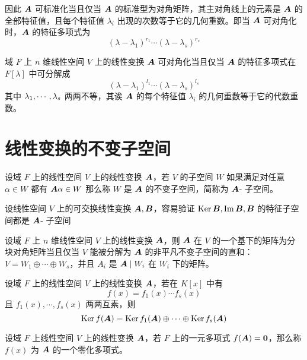 因此 $\boldsymbol{A}$ 可标准化当且仅当 $\boldsymbol{A}$ 的标准型为对角矩阵，其主对角线上的元素是 $\boldsymbol{A}$ 的全部特征值，且每个特征值 $\lambda_i$ 出现的次数等于它的几何重数。即当 $\boldsymbol{A}$ 可对角化时，$\boldsymbol{A}$ 的特征多项式为
\[ (\lambda - \lambda_1)^{r_1}\cdots(\lambda - \lambda_s)^{r_s} \]

\begin{theorem}
    域 $F$ 上 $n$ 维线性空间 $V$ 上的线性变换 $\boldsymbol{A}$ 可对角化当且仅当 $\boldsymbol{A}$ 的特征多项式在 $F[\lambda]$ 中可分解成
    \[ (\lambda - \lambda_1)^{l_1} \cdots (\lambda - \lambda_s)^{l_s} \]
    其中 $\lambda_1,\cdots,\lambda_s$ 两两不等，其诶 $\boldsymbol{A}$ 的每个特征值 $\lambda_i$ 的几何重数等于它的代数重数。
\end{theorem}

\section{线性变换的不变子空间}

\begin{definition}[不变子空间] 
    设域 $F$ 上的线性空间 $V$ 上的线性变换 $\boldsymbol{A}$，若 $V$ 的子空间 $W$ 如果满足对任意 $\alpha \in W$ 都有 $\boldsymbol{A} \alpha \in W$ 那么称 $W$ 是 $\boldsymbol{A}$ 的不变子空间，简称为 $\boldsymbol{A}$- 子空间。
\end{definition}

设线性空间 $V$ 上的可交换线性变换 $\boldsymbol{A},\boldsymbol{B}$，容易验证 $\operatorname{Ker} \boldsymbol{B},\operatorname{Im} \boldsymbol{B},\boldsymbol{B}$ 的特征子空间都是 $\boldsymbol{A}$- 子空间

\begin{theorem}
    设域 $F$ 上 $n$ 维线性空间 $V$ 上的线性变换 $\boldsymbol{A}$，则 $\boldsymbol{A}$ 在 $V$ 的一个基下的矩阵为分块对角矩阵当且仅当 $V$ 能被分解为 $\boldsymbol{A}$ 的非平凡不变子空间的直和：$V = W_1 \oplus \cdots \oplus W_s$，并且 $A_i$ 是 $\boldsymbol{A} \mid W_i$ 在 $W_i$ 下的矩阵。
\end{theorem}

\begin{theorem}
    设域 $F$ 上的线性空间 $V$ 上的线性变换 $\boldsymbol{A}$，若在 $K[x]$ 中有
    \[ f(x) = f_1(x) \cdots f_s(x) \]
    且 $f_1(x),\cdots,f_s(x)$ 两两互素，则
    \[ \operatorname{Ker} f(\boldsymbol{A}) = \operatorname{Ker} f_1(\boldsymbol{A}) \oplus \cdots \oplus \operatorname{Ker} f_s(\boldsymbol{A}) \]
\end{theorem}

\begin{definition}[零化多项式] 
    设域 $F$ 上线性空间 $V$ 上的线性变换 $\boldsymbol{A}$，若 $F$ 上的一元多项式 $f(\boldsymbol{A}) = \boldsymbol{0}$，那么称 $f(x)$ 为 $\boldsymbol{A}$ 的一个零化多项式。
\end{definition}

